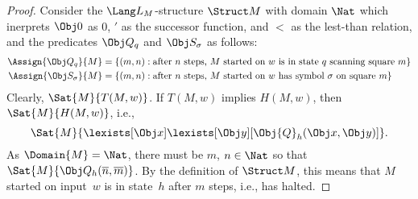 \documentclass[../../include/open-logic-section]{subfiles}
\begin{document}
\begin{proof}
Consider the $\Lang L_M$-structure $\Struct M$ with domain $\Nat$
which inerprets $\Obj 0$ as $0$, $'$ as the successor function, and
$<$ as the lest-than relation, and the predicates $\Obj Q_q$ and
$\Obj S_\sigma$ as follows:
\begin{align*}
\Assign{\Obj Q_q}{M} & = \{(m, n) : \text{after $n$ steps, $M$ started
  on $w$ is in state $q$ scanning square~$m$}\} \\
\Assign{\Obj S_\sigma}{M} & = \{(m, n) : \text{after $n$ steps, $M$ started
  on $w$ has symbol~$\sigma$ on square~$m$}\} \\
\end{align*}
Clearly, $\Sat{M}{T(M, w)}$. If $T(M, w)$ implies $H(M, w)$, then
$\Sat{M}{H(M, w)}$, i.e.,
\[
\Sat{M}{\lexists[\Obj x]\lexists[\Obj y][\Obj{Q}_h(\Obj x, \Obj y)]}.
\]
As $\Domain{M} = \Nat$, there must be $m$, $n \in \Nat$ so that
$\Sat{M}{\Obj Q_h(\overline{n}, \overline{m})}$. By the definition of
$\Struct M$, this means that $M$ started on input~$w$ is in state~$h$
after $m$ steps, i.e., has halted.
\end{proof}
\end{document}
